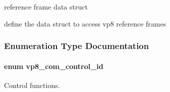 reference frame data struct 

define the data struct to access vp8 reference frames 

\subsubsection{\-Enumeration \-Type \-Documentation}
\hypertarget{group__vp8_ga8cadbc8e0af3da96ef7a2dbd4ed06599}{
\paragraph[{vp8\-\_\-com\-\_\-control\-\_\-id}]{\setlength{\rightskip}{0pt plus 5cm}enum {\bf vp8\-\_\-com\-\_\-control\-\_\-id}}}
\label{group__vp8_ga8cadbc8e0af3da96ef7a2dbd4ed06599}


\-Control functions. 

